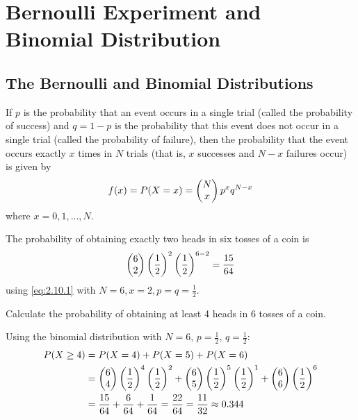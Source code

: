 \section{Bernoulli Experiment and Binomial Distribution}

\subsection{The Bernoulli and Binomial Distributions}

If $p$ is the probability that an event occurs in a single trial (called the probability of success) and $q = 1 - p$ is the probability that this event does not occur in a single trial (called the probability of failure), then the probability that the event occurs exactly $x$ times in $N$ trials (that is, $x$ successes and $N - x$ failures occur) is given by
\begin{align}
 \label{eq:2.10.1}
 f(x)=P(X=x)=\begin{pmatrix} N \\ x\end{pmatrix}p^{x}q^{N-x}
\end{align}
where $x=0,1,...,N.$

\begin{ejemplo}
  \label{exmp:2.10.1}
  The probability of obtaining exactly two heads in six tosses of a coin is
  \begin{align}
   \begin{pmatrix} 6 \\ 2\end{pmatrix}\left( \dfrac{1}{2} \right)^{2}\left( \dfrac{1}{2} \right)^{6-2}=\dfrac{15}{64}
  \end{align}
  using \eqref{eq:2.10.1} with $N=6, x=2, p=q=\frac{1}{2}.$
\end{ejemplo}

\begin{ejemplo}
 \label{exmp:2.10.2}
 Calculate the probability of obtaining at least 4 heads in 6 tosses of a coin.
\end{ejemplo}

\begin{solucion}
	Using the binomial distribution with $N=6$, $p=\frac{1}{2}$, $q=\frac{1}{2}$:
	\begin{align}
		P(X \geq 4) &= P(X=4) + P(X=5) + P(X=6) \\
		&= \begin{pmatrix} 6 \\ 4\end{pmatrix}\left(\frac{1}{2}\right)^4\left(\frac{1}{2}\right)^2 + \begin{pmatrix} 6 \\ 5\end{pmatrix}\left(\frac{1}{2}\right)^5\left(\frac{1}{2}\right)^1 + \begin{pmatrix} 6 \\ 6\end{pmatrix}\left(\frac{1}{2}\right)^6 \\
		&= \frac{15}{64} + \frac{6}{64} + \frac{1}{64} = \frac{22}{64} = \frac{11}{32} \approx 0.344
	\end{align}
\end{solucion}


